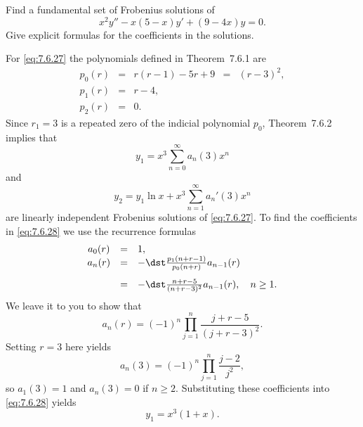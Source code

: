 \setcounter{example}{3}
\setcounter{equation}{26}
\begin{example}
  \label{example:7.6.4} \rm Find a fundamental set of Frobenius solutions of
  \begin{equation}
    \label{eq:7.6.27}x^{2}y''-x(5-x)y'+(9-4x)y=0.
  \end{equation}
  Give explicit formulas for the coefficients in the solutions.
\end{example}
\setcounter{equation}{27}
\begin{examplesolution}
\solution For \eqref{eq:7.6.27} the polynomials defined in Theorem~7.6.1 are
\[
  \begin{array}{ccccc}
    p_{0}(r) & = & r(r-1)-5r+9 & = & (r-3)^{2}, \\[5pt]
    p_{1}(r) & = & r-4,         \\[5pt]
    p_{2}(r) & = & 0.
  \end{array}
\]
Since $r_{1}=3$ is a repeated zero of the indicial polynomial $p_{0}$, Theorem~7.6.2
implies that
\begin{equation}
  \label{eq:7.6.28}y_{1}=x^{3}\sum_{n=0}^{\infty}a_{n}(3)x^{n}
\end{equation}
and
\begin{equation}
  \label{eq:7.6.29}y_{2}=y_{1}\ln x+x^{3}\sum_{n=1}^{\infty}a_{n}'(3)x^{n}
\end{equation}
are linearly independent Frobenius solutions of \eqref{eq:7.6.27}. To find the coefficients in
\eqref{eq:7.6.28} we use the recurrence formulas
\[
  \begin{array}{ccl}
    a_{0}(r) & = & 1,                                                    \\
    a_{n}(r) & = & -\dst\frac{p_{1}(n+r-1)}{p_{0}(n+r)}a_{n-1}(r)        \\[10pt]
             & = & -\dst\frac{n+r-5}{(n+r-3)^{2}}a_{n-1}(r),\quad n\ge1.
  \end{array}
\]
We leave it to you to show that
\begin{equation}
  \label{eq:7.6.30}a_{n}(r)=(-1)^{n}\prod_{j=1}^{n}\frac{j+r-5}{(j+r-3)^{2}}.
\end{equation}
Setting $r=3$ here yields
\[
  a_{n}(3)=(-1)^{n}\prod_{j=1}^{n}\frac{j-2}{j^{2}},
\]
so $a_{1}(3)=1$ and $a_{n}(3)=0$ if $n\ge2$. Substituting these coefficients into \eqref{eq:7.6.28}
yields
\[
  y_{1}=x^{3}(1+x).
\]


\end{examplesolution}
